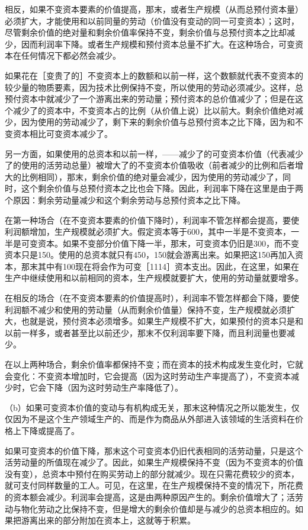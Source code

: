 相反，如果不变资本要素的价值提高，那末，或者生产规模（从而总预付资本量）必须扩大，才能使用和以前同量的劳动（价值没有变动的同一可变资本）；这时，尽管剩余价值的绝对量和剩余价值率保持不变，剩余价值与总预付资本之比却减少，因而利润率下降。或者生产规模和预付资本总量不扩大。在这种场合，可变资本在任何情况下都必然会减少。

如果花在［变贵了的］不变资本上的数额和以前一样，这个数额就代表不变资本的较少量的物质要素，因为技术比例保持不变，所以使用的劳动必须减少。这样，总预付资本中就减少了一个游离出来的劳动量；预付资本的总价值减少了；但是在这个减少了的资本中，不变资本占的比例（从价值上说）比以前大。剩余价值绝对减少，因为使用的劳动减少了，剩下来的剩余价值与总预付资本之比下降，因为和不变资本相比可变资本减少了。

另一方面，如果使用的总资本和以前一样，——减少了的可变资本价值（代表减少了的使用的活劳动总量）被增大了的不变资本价值吸收（前者减少的比例和后者增大的比例相同），那末，剩余价值的绝对量会减少，因为使用的劳动减少了，同时，这个剩余价值与总预付资本之比也会下降。因此，利润率下降在这里是由于两个原因：剩余劳动量减少和这个剩余劳动与总预付资本之比下降。

在第一种场合（在不变资本要素的价值下降时），利润率不管怎样都会提高，要使利润额增加，生产规模就必须扩大。假定资本等于600，其中一半是不变资本，一半是可变资本。如果不变部分价值下降一半，那末，可变资本仍旧是300，而不变资本只是150。使用的总资本就只有450，150就会游离出来。如果把这150再加入资本，那末其中有100现在将会作为可变［1114］资本支出。因此，在这里，如果在生产中继续使用和以前相同的资本，生产规模就要扩大，使用的劳动量就要增多。

在相反的场合（在不变资本要素的价值提高时），利润率不管怎样都会下降，要使利润额不减少和使用的劳动量（从而剩余价值量）保持不变，生产规模就必须扩大，也就是说，预付资本必须增多。如果生产规模不扩大，如果预付的资本只是和以前一样多，或者甚至比以前还少，那末不仅利润率要下降，而且利润量也要减少。

在以上两种场合，剩余价值率都保持不变；而在资本的技术构成发生变化时，它就会变化：不变资本增加时，它会提高（因为这时劳动生产率提高了），不变资本减少时，它会下降（因为这时劳动生产率降低了）。

（b）如果可变资本价值的变动与有机构成无关，那末这种情况之所以能发生，仅仅因为不是这个生产领域生产的、而是作为商品从外部进入该领域的生活资料在价格上下降或提高了。

如果可变资本的价值下降，那末这个可变资本仍旧代表相同的活劳动量，只是这个活劳动量的所值现在减少了。因此，如果生产规模保持不变（因为不变资本的价值没有变），总资本中预付在购买劳动上的部分就减少。现在只需花费较少的资本，就可支付同样数量的工人。可见，在这里，在生产规模保持不变的情况下，所花费的资本额会减少。利润率会提高，这是由两种原因产生的。剩余价值增大了；活劳动与物化劳动之比保持不变，但是增大的剩余价值却是与减少的总资本相应的。如果把游离出来的部分附加在资本上，这就等于积累。

